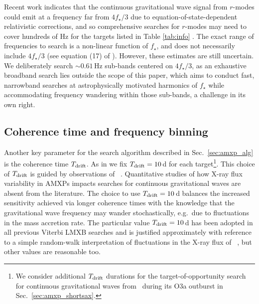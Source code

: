 Recent work indicates that the continuous gravitational wave signal from $r$-modes could emit at a frequency far from $4f_\star / 3$ due to equation-of-state-dependent relativistic corrections, and so comprehensive searches for $r$-modes may need to cover hundreds of Hz for the targets listed in Table \ref{tab:info} \cite{Idrisy2015, Caride2019}. The exact range of frequencies to search is a non-linear function of $f_\star$, and does not necessarily include $4f_\star /3$ (see equation (17) of \citet{Caride2019}). However, these estimates are still uncertain. We deliberately search $\sim0.61\,$Hz sub-bands centered on $4f_\star / 3$, as an exhaustive broadband search lies outside the scope of this paper, which aims to conduct fast, narrowband searches at astrophysically motivated harmonics of $f_\star$ while accommodating frequency wandering within those sub-bands, a challenge in its own right.

\subsection{Coherence time and frequency binning \label{sec:amxp_tdr}}
Another key parameter for the search algorithm described in Sec.~\ref{sec:amxp_alg} is the coherence time $T_{\textrm{drift}}$. As in \citet{o2vitsco, Middleton2020} we fix $T_{\textrm{drift}}=10\,$d for each target\footnote{We consider additional $T_{\textrm{drift}}$ durations for the target-of-opportunity search for continuous gravitational waves from \sax\ during its O3a outburst in Sec.~\ref{sec:amxp_shortsax}.}. This choice of $T_{\textrm{drift}}$ is guided by observations of \sco\ \cite{Mukherjee2018}. Quantitative studies of how X-ray flux variability in AMXPs impacts searches for continuous gravitational waves are absent from the literature. The choice to use $T_{\textrm{drift}}=10\,$d balances the increased sensitivity achieved via longer coherence times with the knowledge that the gravitational wave frequency may wander stochastically, e.g.~due to fluctuations in the mass accretion rate. The particular value $T_{\textrm{drift}}=10\,$d has been adopted in all previous Viterbi LMXB searches \cite{o1vitsco, o2vitsco, Middleton2020} and is justified approximately with reference to a simple random-walk interpretation of fluctuations in the X-ray flux of \sco\ \cite{Sammut2014, Messenger2015a, Mukherjee2018}, but other values are reasonable too. 

